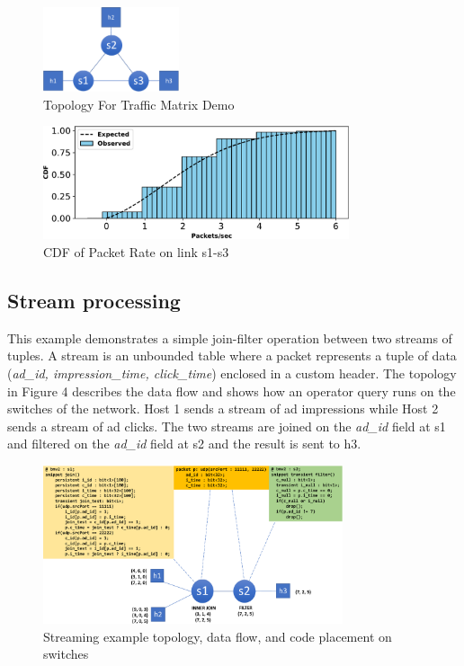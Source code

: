 \begin{figure}[tp]
\centering
\includegraphics[width=40mm,scale=0.7]{figures/traf_mat_topo}
\caption{Topology For Traffic Matrix Demo}
\end{figure}

 \vspace{-4mm}

\begin{figure}[tp]
\centering
\includegraphics[width=90mm,scale=0.7]{figures/exp_obs_cdf}
\caption{CDF of Packet Rate on link s1-s3}
\end{figure}

 \vspace{1mm}
\subsection{Stream processing}
 \vspace{-1mm}

This example demonstrates a simple join-filter operation between two streams of
tuples. A stream is an unbounded table where a packet represents a tuple of
data (\textit{ad\_id, impression\_time, click\_time}) enclosed in a custom
header. The topology in Figure 4 describes the data flow and shows how an
operator query runs on the switches of the network. Host 1 sends a stream of ad
impressions while Host 2 sends a stream of ad clicks. The two streams are
joined on the \textit{ad\_id} field at s1 and filtered on the \textit{ad\_id}
field at s2 and the result is sent to h3. 

\begin{figure}[tp]
\centering
\includegraphics[width=88mm]{figures/streaming_example}
\caption{Streaming example topology, data flow, and code placement on switches}
\vspace{-5mm}
\end{figure}
\vspace{-3mm}


